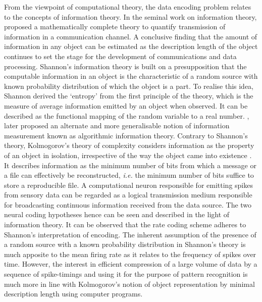 From the viewpoint of computational theory, the data encoding problem relates to the concepts of information theory. In the seminal work on information theory, \citet{shannon2001mathematical} proposed a mathematically complete theory to quantify transmission of information in a communication channel. A conclusive finding that the amount of information in any object can be estimated as the description length of the object continues to set the stage for the development of communications and data processing. Shannon's information theory is built on a presupposition that the computable information in an object is the characteristic of a random source with known probability distribution of which the object is a part. To realise this idea, Shannon derived the `entropy' from the first principle of the theory, which is the measure of average information emitted by an object when observed. It can be described as the functional mapping of the random variable to a real number. \citet{kolmogorov1965three}, later proposed an alternate and more generalisable notion of information measurement known as algorithmic information theory. Contrary to Shannon's theory, Kolmogorov's theory of complexity \citep{kolmogorov1965three, chaitin1966length} considers information as the property of an object in isolation, irrespective of the way the object came into existence \citep{grunwald2004shannon}. It describes information as the minimum number of bits from which a message or a file can effectively be reconstructed, \emph{i.e.} the minimum number of bits suffice to store a reproducible file. A computational neuron responsible for emitting spikes from sensory data can be regarded as a logical transmission medium responsible for broadcasting continuous information received from the data source. The two neural coding hypotheses hence can be seen and described in the light of information theory. It can be observed that the rate coding scheme adheres to Shannon's interpretation of encoding. The inherent assumption of the presence of a random source with a known probability distribution in Shannon's theory is much apposite to the mean firing rate as it relates to the frequency of spikes over time. However, the interest in efficient compression of a large volume of data by a sequence of spike-timings and using it for the purpose of pattern recognition is much more in line with Kolmogorov's notion of object representation by minimal description length using computer programs. 

